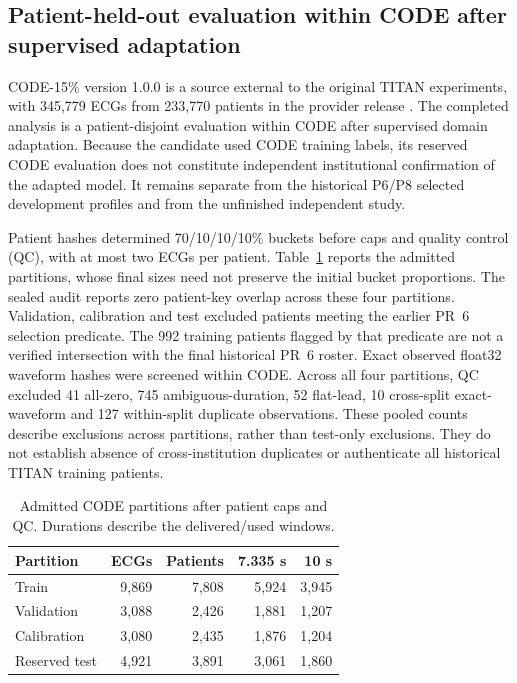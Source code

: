 \subsection{Patient-held-out evaluation within CODE after supervised adaptation}
\label{sec:code-methods}
CODE-15\% version 1.0.0 is a source external to the original TITAN experiments, with 345,779 ECGs from 233,770 patients in the provider release \citep{CODE15Dataset}. The completed analysis is a patient-disjoint evaluation within CODE after supervised domain adaptation. Because the candidate used CODE training labels, its reserved CODE evaluation does not constitute independent institutional confirmation of the adapted model. It remains separate from the historical P6/P8 selected development profiles and from the unfinished independent study.

Patient hashes determined 70/10/10/10\% buckets before caps and quality control (QC), with at most two ECGs per patient. Table~\ref{tab:code-cohort} reports the admitted partitions, whose final sizes need not preserve the initial bucket proportions. The sealed audit reports zero patient-key overlap across these four partitions. Validation, calibration and test excluded patients meeting the earlier PR~6 selection predicate. The 992 training patients flagged by that predicate are not a verified intersection with the final historical PR~6 roster. Exact observed float32 waveform hashes were screened within CODE. Across all four partitions, QC excluded 41 all-zero, 745 ambiguous-duration, 52 flat-lead, 10 cross-split exact-waveform and 127 within-split duplicate observations. These pooled counts describe exclusions across partitions, rather than test-only exclusions. They do not establish absence of cross-institution duplicates or authenticate all historical TITAN training patients.

\begin{table}[htbp]
\caption{Admitted CODE partitions after patient caps and QC. Durations describe the delivered/used windows.\label{tab:code-cohort}}
\centering\small
\begin{tabular}{lrrrr}
\toprule
Partition & ECGs & Patients & 7.335 s & 10 s \\
\midrule
Train & 9,869 & 7,808 & 5,924 & 3,945 \\
Validation & 3,088 & 2,426 & 1,881 & 1,207 \\
Calibration & 3,080 & 2,435 & 1,876 & 1,204 \\
Reserved test & 4,921 & 3,891 & 3,061 & 1,860 \\
\bottomrule
\end{tabular}
\end{table}

